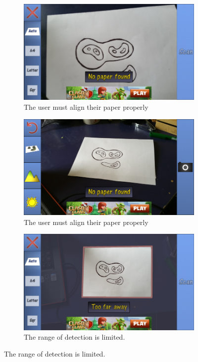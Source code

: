 \documentclass[11pt]{article}
\begin{document}
\begin{figure}[!ht]
	\centering
	\begin{subfigure}[t]{.4\textwidth}
		\centering
		\includegraphics[scale=0.3]{pics/landscapeARNoPaper.png}
		\caption{The user must align their paper properly}
		\label{fig:landscapeAugmented RealityNoPaper1}
	\end{subfigure}
	\hfill
	\begin{subfigure}[t]{.4\textwidth}
		\centering
		\includegraphics[scale=0.3]{pics/landscapeARNoPaper2.png}
		\caption{The user must align their paper properly}
		\label{fig:landscapeAugmented RealityNoPaper2}
	\end{subfigure}
	
	
	\begin{subfigure}[t]{.4\textwidth}
		\centering
		\includegraphics[scale=0.3]{pics/landscapeARTooFar.png}
		\caption{The range of detection is limited.}
		\label{fig:landscapeAugmented RealityNoTooFar}
	\end{subfigure}


\end{figure}
\end{document}
